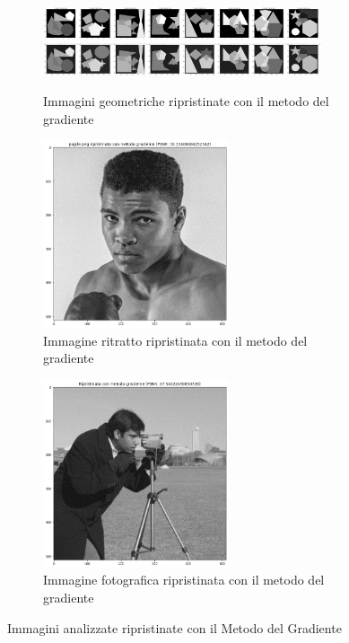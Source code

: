 \begin{figure}[H]
    \centering
    \begin{subfigure}{0.9\textwidth}
        \centering
    \includegraphics[width=0.9\textwidth]{imgRel/datasetgradiente.png}\label{fig:geomgradiente}
    \caption{Immagini geometriche ripristinate con il metodo del gradiente}
    \end{subfigure}

    \begin{subfigure}{0.5\textwidth}
        \centering
        \includegraphics[width=0.6\textwidth]{imgRel/fotogrmg.png}
        \caption{Immagine ritratto ripristinata con il metodo del gradiente}
        \label{fig: pugilemg1}
    \end{subfigure}%
    \begin{subfigure}{0.5\textwidth}\centering
        \includegraphics[width=0.6\textwidth]{MANCANTI/cameramanPuntoDueGrad.png}
        \caption{Immagine fotografica ripristinata con il metodo del gradiente}
    \end{subfigure}
\caption{Immagini analizzate ripristinate con il Metodo del Gradiente}
\end{figure}

